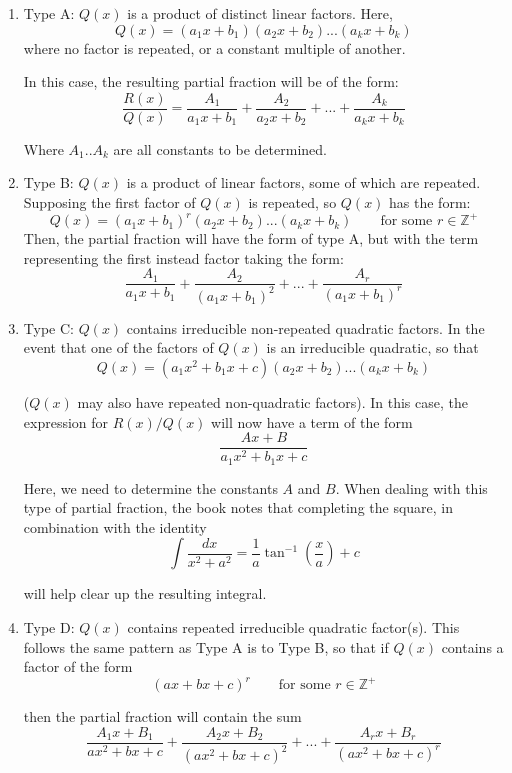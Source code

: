 \documentclass[10pt,a4paper]{report}
\begin{document}
\begin{enumerate}
	\item Type A: $Q(x)$ is a product of distinct linear factors. Here, 
	$$
		Q(x) = (a_1 x + b_1)(a_2 x + b_2)...(a_k x+ b_k)
	$$
	where no factor is repeated, or a constant multiple of another.

	In this case, the resulting partial fraction will be of the form:
	$$
		\frac{R(x)}{Q(x)} = \frac{A_1}{a_1x + b_1} + \frac{A_2}{a_2 x + b_2} + ... + \frac{A_k}{a_k x + b_k}
	$$

	Where $A_1 .. A_k$ are all constants to be determined.

	\item Type B: $Q(x)$ is a product of linear factors, some of which are repeated. Supposing the first factor of $Q(x)$ is repeated, so $Q(x)$ has the form:
	$$
		Q(x) = (a_1 x + b_1)^r(a_2 x + b_2)...(a_k x+ b_k) \qquad \text{for some } r \in \mathbb{Z^+}
	$$
	Then, the partial fraction will have the form of type A, but with the term representing the first instead factor taking the form:
	$$
		\frac{A_1}{a_1x + b_1} + \frac{A_2}{(a_1 x + b_1)^2} + ... + \frac{A_r}{(a_1 x + b_1)^r}
	$$

	\item Type C: $Q(x)$ contains irreducible non-repeated quadratic factors. In the event that one of the factors of $Q(x)$ is an irreducible quadratic, so that
	$$
		Q(x) = (a_1 x^2 + b_1x + c)(a_2 x + b_2)...(a_k x+ b_k)
	$$

	($Q(x)$ may also have repeated non-quadratic factors). In this case, the expression for $R(x)/Q(x)$ will now have a term of the form
	$$
		\frac{Ax + B}{a_1 x^2 + b_1x + c}
	$$

	Here, we need to determine the constants $A$ and $B$. When dealing with this type of partial fraction, the book notes that completing the square, in combination with the identity
	$$
		\int \frac{dx}{x^2 + a^2} = \frac{1}{a} \tan^{-1} \left( \frac{x}{a} \right) + c
	$$

	will help clear up the resulting integral.

	\item Type D: $Q(x)$ contains repeated irreducible quadratic factor(s). This follows the same pattern as Type A is to Type B, so that if $Q(x)$ contains a factor of the form
	$$
		(ax + bx + c)^r \qquad \text{for some } r \in \mathbb{Z^+}
	$$

	then the partial fraction will contain the sum
	$$
		\frac{A_1 x + B_1}{ax^2 + bx + c} + \frac{A_2 x + B_2}{(ax^2 + bx + c)^2} + ... + \frac{A_r x + B_r}{(ax^2 + bx + c)^r}
	$$

\end{enumerate}
\end{document}
